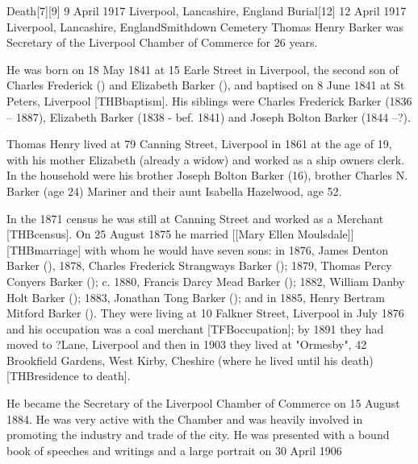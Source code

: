 




Death[7][9] 	9 April 1917 	Liverpool, Lancashire, England
Burial[12] 	12 April 1917 	Liverpool, Lancashire, EnglandSmithdown Cemetery
Thomas Henry Barker was Secretary of the Liverpool Chamber of Commerce for 26 years.\cite{THBbio}

He was born on 18 May 1841\cite{THBbirth} at 15 Earle Street in Liverpool,\cite{THBplantagenets} the second son of Charles Frederick () and Elizabeth Barker (), and baptised on 8 June 1841 at St Peters, Liverpool [THBbaptism].  His siblings were Charles Frederick Barker (1836 -- 1887),  Elizabeth Barker (1838 - bef. 1841) and Joseph Bolton Barker (1844 --?). 

Thomas Henry lived at 79 Canning Street, Liverpool in 1861 at the age of 19, with his mother Elizabeth (already a widow) and worked as a ship owners clerk.  In the household were his brother Joseph Bolton Barker (16), brother Charles N. Barker (age 24) Mariner and their aunt Isabella Hazelwood, age 52.

In the 1871 census he was still at Canning Street and worked as a Merchant [THBcensus].
On 25 August 1875 he married [[Mary Ellen Moulsdale]][THBmarriage] with whom he would have seven sons:\cite{THBplantagenets}
in 1876, James Denton Barker (),
1878, Charles Frederick Strangways Barker ();
1879, Thomas Percy Conyers Barker ();
c. 1880, Francis Darcy Mead Barker ();
1882, William Danby Holt Barker ();
1883, Jonathan Tong Barker (); and in
1885, Henry Bertram Mitford Barker ().
They were living at 10 Falkner Street, Liverpool in July 1876 and his occupation was a coal merchant [TFBoccupation];  by 1891 they had moved to ?Lane, Liverpool and then in 1903 they lived at "Ormesby", 42 Brookfield Gardens, West Kirby, Cheshire (where he lived until his death)[THBresidence to death].

He became the Secretary of the Liverpool Chamber of Commerce on 15 August 1884.  He was very active with the Chamber and was heavily involved in promoting the industry and trade of the city.  He was presented with a bound book of speeches and writings and a large portrait on 30 April 1906

